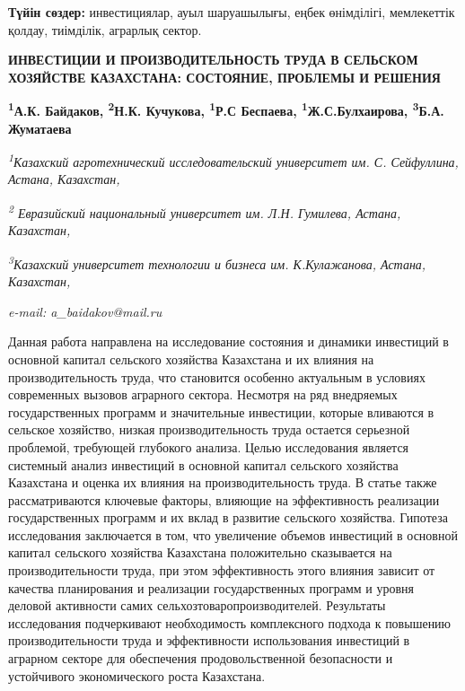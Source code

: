{\bfseries Түйін сөздер:} инвестициялар, ауыл шаруашылығы, еңбек
өнімділігі, мемлекеттік қолдау, тиімділік, аграрлық сектор.

\begin{articleheader}
{\bfseries ИНВЕСТИЦИИ И ПРОИЗВОДИТЕЛЬНОСТЬ ТРУДА В СЕЛЬСКОМ ХОЗЯЙСТВЕ КАЗАХСТАНА: СОСТОЯНИЕ, ПРОБЛЕМЫ И РЕШЕНИЯ}

{\bfseries
\textsuperscript{1}А.К. Байдаков\textsuperscript{\envelope },
\textsuperscript{2}Н.К. Кучукова,
\textsuperscript{1}Р.С Беспаева,
\textsuperscript{1}Ж.С.Булхаирова,
\textsuperscript{3}Б.А. Жуматаева}
\end{articleheader}

\begin{affiliation}
\emph{\textsuperscript{1}Казахский агротехнический исследовательский университет им. С. Сейфуллина, Астана, Казахстан,}

\emph{\textsuperscript{2} Евразийский национальный университет им. Л.Н. Гумилева, Астана, Казахстан,}

\emph{\textsuperscript{3}Казахский университет технологии и бизнеса им. К.Кулажанова, Астана, Казахстан,}

\emph{e-mail: a\_baidakov@mail.ru}
\end{affiliation}

Данная работа направлена на исследование состояния и динамики инвестиций
в основной капитал сельского хозяйства Казахстана и их влияния на
производительность труда, что становится особенно актуальным в условиях
современных вызовов аграрного сектора. Несмотря на ряд внедряемых
государственных программ и значительные инвестиции, которые вливаются в
сельское хозяйство, низкая производительность труда остается серьезной
проблемой, требующей глубокого анализа. Целью исследования является
системный анализ инвестиций в основной капитал сельского хозяйства
Казахстана и оценка их влияния на производительность труда. В статье
также рассматриваются ключевые факторы, влияющие на эффективность
реализации государственных программ и их вклад в развитие сельского
хозяйства. Гипотеза исследования заключается в том, что увеличение
объемов инвестиций в основной капитал сельского хозяйства Казахстана
положительно сказывается на производительности труда, при этом
эффективность этого влияния зависит от качества планирования и
реализации государственных программ и уровня деловой активности самих
сельхозтоваропроизводителей. Результаты исследования подчеркивают
необходимость комплексного подхода к повышению производительности труда
и эффективности использования инвестиций в аграрном секторе для
обеспечения продовольственной безопасности и устойчивого экономического
роста Казахстана.

